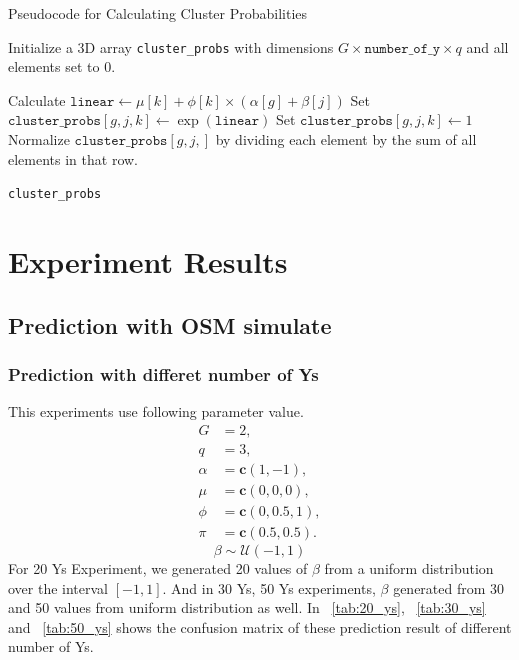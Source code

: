 \documentclass{article}
\begin{document}
\begin{algorithm}
  \caption{Pseudocode for Calculating Cluster Probabilities}
  \label{fig:algo}
  \begin{algorithmic}[1]
  \STATE Initialize a 3D array \texttt{cluster\_probs} with dimensions $G \times \texttt{number\_of\_y} \times q$ and all elements set to 0.
  
                  \STATE Calculate $\texttt{linear} \gets \mu[k] + \phi[k] \times (\alpha[g] + \beta[j])$
                  \STATE Set $\texttt{cluster\_probs}[g, j, k] \gets \exp(\texttt{linear})$
              \ELSE
                  \STATE Set $\texttt{cluster\_probs}[g, j, k] \gets 1$
              \ENDIF
          \ENDFOR
          \STATE Normalize $\texttt{cluster\_probs}[g, j,]$ by dividing each element by the sum of all elements in that row.
      \ENDFOR
  \ENDFOR
  
  \RETURN \texttt{cluster\_probs}
  \end{algorithmic}
  \end{algorithm}


\section{Experiment Results}

\subsection{Prediction with OSM simulate}

\subsubsection*{Prediction with differet number of Ys}

This experiments use following parameter value.
\[
\begin{aligned}
G &= 2, \\
q &= 3, \\
\alpha &= \mathbf{c}(1, -1), \\
\mu &= \mathbf{c}(0, 0, 0), \\
\phi &= \mathbf{c}(0, 0.5, 1), \\
\pi &= \mathbf{c}(0.5, 0.5).
\end{aligned}
\]
\[
\beta \sim \mathcal{U}(-1, 1)
\]
For 20 Ys Experiment, we generated 20 values of $\beta$ from a uniform distribution over the interval $[-1, 1]$.
And in 30 Ys, 50 Ys experiments, $\beta$ generated from 30 and 50 values from uniform distribution as well.
In ~\ref*{tab:20_ys}, ~\ref*{tab:30_ys} and ~\ref*{tab:50_ys} shows the confusion matrix of these prediction result of different number of Ys.
\end{document}
